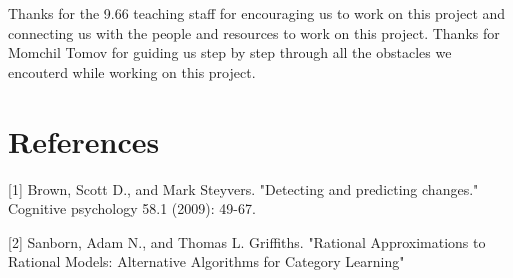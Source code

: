 \documentclass[12pt,letterpaper]{article}
\begin{document}
Thanks for the 9.66 teaching staff for encouraging us to work on this project and connecting us with the people and resources to work on this project. Thanks for Momchil Tomov for guiding us step by step through all the obstacles we encouterd while working on this project.

\section{References}




[1] Brown, Scott D., and Mark Steyvers. "Detecting and predicting changes." Cognitive psychology 58.1 (2009): 49-67.


[2] Sanborn, Adam N., and Thomas L. Griffiths. "Rational Approximations to Rational Models:
Alternative Algorithms for Category Learning"

\onecolumn
\end{document}
